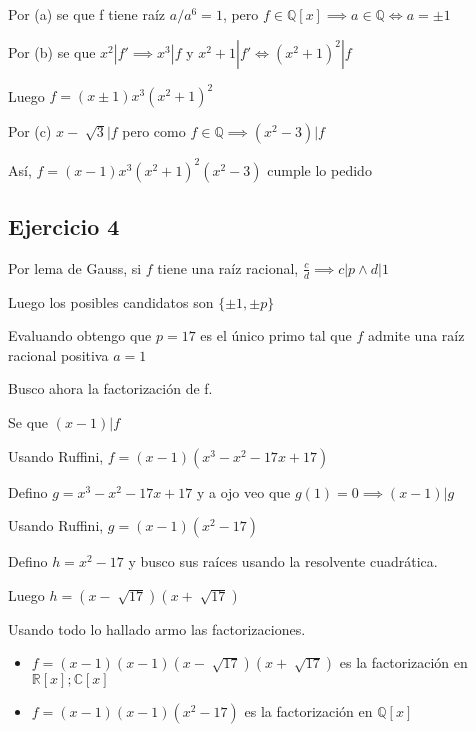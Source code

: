 Por (a) se que f tiene raíz $ a / a^6 = 1 $, pero $ f \in \mathbb{Q}[x] \implies a \in \mathbb{Q} \iff a =\pm 1 $

Por (b) se que $ x^2 | f' \implies x^3 | f $ y $ x^2 + 1 | f' \iff (x^2 + 1)^2 | f $

Luego $ f = (x \pm 1)x^3(x^2+1)^2 $

Por (c) $ x- \sqrt[]{3} | f $ pero como $ f \in \mathbb{Q} \implies (x^2 - 3) |f $

Así, $ f = (x-1)x^3(x^2+1)^2(x^2-3) $ cumple lo pedido

\subsection{Ejercicio 4}

Por lema de Gauss, si $f$ tiene una raíz racional, $ \frac{c}{d} \implies c|p \wedge d | 1 $

Luego los posibles candidatos son $ \{ \pm 1, \pm p \} $

Evaluando obtengo que $ p = 17 $ es el único primo tal que $f$ admite una raíz racional positiva $a = 1$

Busco ahora la factorización de f.

Se que $ (x-1) | f $

Usando Ruffini, $ f = (x-1)(x^3-x^2-17x+17) $

Defino $ g = x^3-x^2-17x+17 $ y a ojo veo que $ g(1) = 0 \implies (x-1) |g $

Usando Ruffini, $ g = (x-1)(x^2-17) $

Defino $ h = x^2-17 $ y busco sus raíces usando la resolvente cuadrática.

Luego $ h = (x-\sqrt[]{17})(x+\sqrt[]{17}) $

Usando todo lo hallado armo las factorizaciones.

\begin{itemize}
    \item $ f = (x-1)(x-1)(x-\sqrt[]{17})(x+\sqrt[]{17}) $ es la factorización en $ \mathbb{R}[x]; \mathbb{C}[x] $
    \item $ f = (x-1)(x-1)(x^2-17) $ es la factorización en $ \mathbb{Q}[x] $
\end{itemize}


